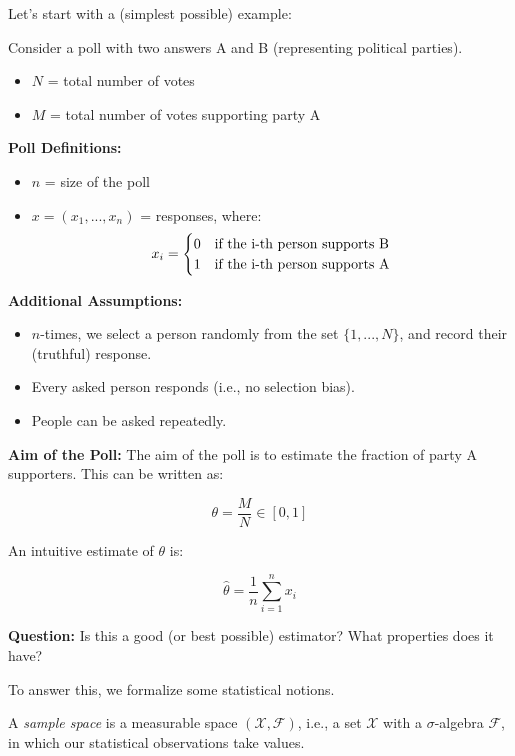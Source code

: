 \documentclass[open=any, 11pt,paper=A4]{scrreprt}
\begin{document}
Let’s start with a (simplest possible) example:

\begin{example}[Polling]\label{ex:polling}
Consider a poll with two answers A and B (representing political parties).
\begin{itemize}
    \item \( N \) = total number of votes
    \item \( M \) = total number of votes supporting party A
\end{itemize}
\end{example}

\textbf{Poll Definitions:}
\begin{itemize}
    \item \( n \) = size of the poll
    \item \( x = (x_1, ..., x_n) \) = responses, where:
    \[
    x_i =
    \begin{cases} 
    0 & \text{if the i\text{-}th person supports B} \\
    1 & \text{if the i\text{-}th person supports A}
    \end{cases}
    \]
\end{itemize}

\textbf{Additional Assumptions:}
\begin{itemize}
    \item \( n \)-times, we select a person randomly from the set \( \{1, ..., N\} \), and record their (truthful) response.
    \item Every asked person responds (i.e., no selection bias).
    \item People can be asked repeatedly.
\end{itemize}

\textbf{Aim of the Poll:} The aim of the poll is to estimate the fraction of party A supporters. This can be written as:

\[
\theta = \frac{M}{N} \in [0, 1]
\]

An intuitive estimate of \( \theta \) is:

\[
\hat{\theta} = \frac{1}{n} \sum_{i=1}^{n} x_i
\]

\textbf{Question:} Is this a good (or best possible) estimator? What properties does it have?

To answer this, we formalize some statistical notions.

\begin{definition}\label{def:samplespace}
A \textit{sample space} is a measurable space \((\mathcal{X}, \mathcal{F})\), i.e., a set \(\mathcal{X}\) with a \(\sigma\)-algebra \(\mathcal{F}\), in which our statistical observations take values.
\end{definition}
\end{document}
